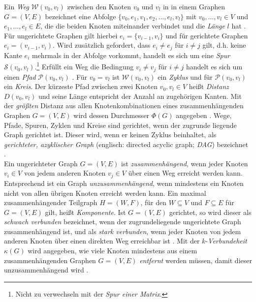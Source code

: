 \documentclass[12pt, a4paper]{report}
\begin{document}
Ein \textit{Weg} $\mathcal{W}(v_0,v_l)$ zwischen den Knoten $v_0$ und $v_l$ in in einem Graphen $G=(V,E)$ bezeichnet eine Abfolge $\{v_0, e_1, v_1, e_2, \dots,e_l,v_l \}$ mit $v_0, \dots, v_l \in V$ und $e_1,\dots,e_l \in E$, die die beiden Knoten miteinander verbindet und die \textit{Länge} $l$ hat \cite{diestel2006graph}. Für ungerichtete Graphen gilt hierbei $e_i=\{v_{i-1}, v_i\}$ und für gerichtete Graphen $e_i=(v_{i-1}, v_i)$. Wird zusätzlich gefordert, dass $e_i \neq e_j$ für $i \neq j$ gilt, d.h. keine Kante $e_i$ mehrmals in der Abfolge vorkommt, handelt es sich um eine \textit{Spur} $\mathcal{S}(v_0,v_l)$.\footnote{Nicht zu verwechseln mit der \textit{Spur einer Matrix}.} Erfüllt ein Weg die Bedingung $v_i \neq v_j$ für $i \neq j$ handelt es sich um einen \textit{Pfad} $\mathcal{P}(v_0,v_l)$  \cite{brandes2005graphfunda}. Für $v_0 = v_l$ ist $\mathcal{W}(v_0,v_l)$ ein \textit{Zyklus} und für $\mathcal{P}(v_0,v_l)$ ein \textit{Kreis}. Der kürzeste Pfad zwischen zwei Knoten $v_0,v_l \in V$ heißt \textit{Distanz} $D(v_0,v_l)$ und seine Länge entspricht der Anzahl an zugehörigen Kanten. Mit der \textit{größten} Distanz aus allen Knotenkombinationen eines zusammenhängenden Graphen $G=(V,E)$ wird dessen Durchmesser $\Phi(G)$ angegeben \cite{diestel2006graph}. Wege, Pfade, Spuren, Zyklen und Kreise sind gerichtet, wenn der zugrunde liegende Graph gerichtet ist. Dieser wird, wenn er keinen Zyklus beinhaltet, als \textit{gerichteter, azyklischer Graph}  (englisch: directed acyclic graph; \textit{DAG}) bezeichnet \cite{kolaczyk2009statistical}.\\

Ein ungerichteter Graph $G=(V,E)$ ist \textit{zusammenhängend}, wenn jeder Knoten $v_i \in V$ von jedem anderen Knoten $v_j \in V$ über einen Weg erreicht werden kann. Entsprechend ist ein Graph \textit{unzusammenhängend}, wenn mindestens ein Knoten nicht von allen übrigen Knoten erreicht werden kann. Ein maximal zusammenhängender Teilgraph $H=(W,F)$, für den $W \subseteq V$ und $F \subseteq E$ für $G=(V,E)$ gilt, heißt \textit{Komponente}. Ist $G=(V,E)$ gerichtet, so wird dieser als \textit{schwach verbunden} bezeichnet, wenn der zugrundeliegende ungerichtete Graph zusammenhängend ist, und als \textit{stark verbunden}, wenn jeder Knoten von jedem anderen Knoten über einen direkten Weg erreichbar ist \cite{brandes2005graphfunda}. Mit der $k$-\textit{Verbundeheit} $\kappa(G)$ wird angegeben, wie viele Knoten mindestens aus einem zusammenhängenden Graphen $G=(V,E)$ \textit{entfernt} werden müssen, damit dieser unzusammenhängend wird \cite{diestel2006graph}. 
\end{document}
